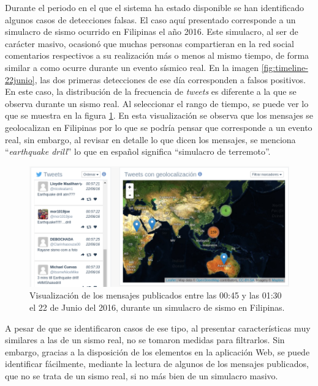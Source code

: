 	Durante el periodo en el que el sistema ha estado disponible se han identificado algunos casos de detecciones falsas. El caso aquí presentado corresponde a un simulacro de sismo ocurrido en Filipinas el año 2016. Este simulacro, al ser de carácter masivo, ocasionó que muchas personas compartieran en la red social comentarios respectivos a su realización más o menos al mismo tiempo, de forma similar a como ocurre durante un evento sísmico real. En la imagen \ref{fig:timeline-22junio}, las dos primeras detecciones de ese día corresponden a falsos positivos. En este caso, la distribución de la frecuencia de \textit{tweets} es diferente a la que se observa durante un sismo real. Al seleccionar el rango de tiempo, se puede ver lo que se muestra en la figura \ref{fig:earthquakedrill}. En esta visualización se observa que los mensajes se geolocalizan en Filipinas por lo que se podría pensar que corresponde a un evento real, sin embargo, al revisar en detalle lo que dicen los mensajes, se menciona ``\textit{earthquake drill}'' lo que en español significa ``simulacro de terremoto''. 
	
	\begin{figure}[h]
	  \centering
	  \includegraphics[width=\textwidth]{imagenes/earthquakedrill.png}
	  \caption{Visualización de los mensajes publicados entre las 00:45 y las 01:30 el 22 de Junio del 2016, durante un simulacro de sismo en Filipinas.}
		\label{fig:earthquakedrill}
	\end{figure}	
	
	A pesar de que se identificaron casos de ese tipo, al presentar características muy similares a las de un sismo real, no se tomaron medidas para filtrarlos. Sin embargo, gracias a la disposición de los elementos en la aplicación Web, se puede identificar fácilmente, mediante la lectura de algunos de los mensajes publicados, que no se trata de un sismo real, si no más bien de un simulacro masivo. 
	
	